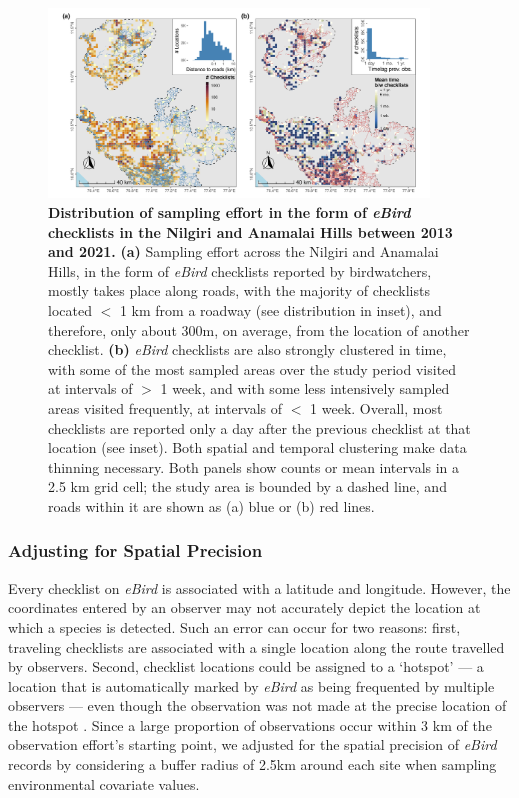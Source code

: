 \begin{figure}[h!]
    \centering
    \includegraphics[width=0.9\textwidth]{figures/hillybirds/fig_03.png}
    \caption{
        \textbf{Distribution of sampling effort in the form of \textit{eBird} checklists in the Nilgiri and Anamalai Hills between 2013 and 2021.}
        \textbf{(a)} Sampling effort across the Nilgiri and Anamalai Hills, in the form of \textit{eBird} checklists reported by birdwatchers, mostly takes place along roads, with the majority of checklists located $<$ 1 km from a roadway (see distribution in inset), and therefore, only about 300m, on average, from the location of another checklist.
        \textbf{(b)} \textit{eBird} checklists are also strongly clustered in time, with some of the most sampled areas over the study period visited at intervals of $>$ 1 week, and with some less intensively sampled areas visited frequently, at intervals of $<$ 1 week.
        Overall, most checklists are reported only a day after the previous checklist at that location (see inset).
        Both spatial and temporal clustering make data thinning necessary.
        Both panels show counts or mean intervals in a 2.5 km grid cell; the study area is bounded by a dashed line, and roads within it are shown as (a) blue or (b) red lines.
    }
    \label{hilly_fig_03}
\end{figure}

\subsubsection*{Adjusting for Spatial Precision}

Every checklist on \textit{eBird} is associated with a latitude and longitude.
However, the coordinates entered by an observer may not accurately depict the location at which a species is detected.
Such an error can occur for two reasons: first, traveling checklists are associated with a single location along the route travelled by observers.
Second, checklist locations could be assigned to a `hotspot' --- a location that is automatically marked by \textit{eBird} as being frequented by multiple observers --- even though the observation was not made at the precise location of the hotspot \citep{praveenj.2017}.
Since a large proportion of observations occur within 3 km of the observation effort's starting point, we adjusted for the spatial precision of \textit{eBird} records by considering a buffer radius of 2.5km around each site when sampling environmental covariate values.

